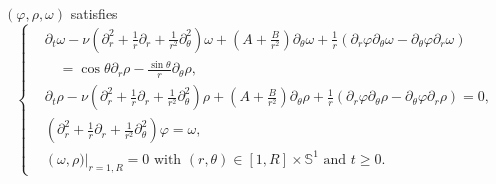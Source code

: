\documentclass[final, 12pt,reqno]{amsart}
\numberwithin{equation}{section}
\begin{document}
$(\varphi,\rho,\omega)$ satisfies
\begin{equation}\label{1.3}
    \left\{
\begin{aligned}
    &   \partial_t \omega-\nu \left(\partial_r^2+\frac{1}{r} \partial_r+\frac{1}{r^2} \partial_\theta^2\right)\omega+\left(A+\frac{B}{r^2}\right) \partial_\theta\omega+\frac{1}{r}\left(\partial_r \varphi \partial_\theta \omega-\partial_\theta \varphi \partial_r \omega\right)\\
    &\quad=\cos\theta\partial_{r}\rho-\frac{\sin\theta}{r}\partial_{\theta}\rho, \\
    &   \partial_t \rho-\nu\left(\partial_r^2+\frac{1}{r} \partial_r+\frac{1}{r^2} \partial_\theta^2\right) \rho+\left(A+\frac{B}{r^2}\right) \partial_\theta \rho+\frac{1}{r}\left(\partial_r \varphi \partial_\theta \rho-\partial_\theta \varphi \partial_r \rho\right)=0, \\
&   \left(\partial_r^2+\frac{1}{r} \partial_r+\frac{1}{r^2} \partial_\theta^2\right) \varphi=\omega,\\
&\left (\omega,\rho)\right|_{r=1, R}=0
\text { with }(r, \theta) \in[1, R] \times \mathbb{S}^1 \text { and } t \geq 0.
    \end{aligned}
\right.
\end{equation}
\end{document}
